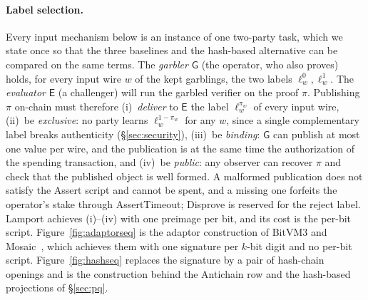 \documentclass[11pt]{article}
\begin{document}
\paragraph{Label selection.} Every input mechanism below is an instance of one
two-party task, which we state once so that the three baselines and the
hash-based alternative can be compared on the same terms. The
\emph{garbler} $\mathsf{G}$ (the operator, who also proves) holds, for every
input wire $w$ of the kept garblings, the two labels $\ell_w^0,\ell_w^1$. The
\emph{evaluator} $\mathsf{E}$ (a challenger) will run the garbled verifier on
the proof $\pi$. Publishing $\pi$ on-chain must therefore (i)~\emph{deliver} to
$\mathsf{E}$ the label $\ell_w^{\pi_w}$ of every input wire, (ii)~be
\emph{exclusive}: no party learns $\ell_w^{1-\pi_w}$ for any $w$, since a
single complementary label breaks authenticity (\S\ref{sec:security}),
(iii)~be \emph{binding}: $\mathsf{G}$ can publish at most one value per wire,
and the publication is at the same time the authorization of the spending
transaction, and (iv)~be \emph{public}: any observer can recover $\pi$ and
check that the published object is well formed. A malformed publication does
not satisfy the Assert script and cannot be spent, and a missing one forfeits
the operator's stake through AssertTimeout; Disprove is reserved for the reject
label. Lamport achieves (i)--(iv) with one
preimage per bit, and its cost is the per-bit script. Figure~\ref{fig:adaptorseq}
is the adaptor construction of BitVM3 and Mosaic~\cite{bitvm3paper,mosaic26},
which achieves them with one signature per $k$-bit digit and no per-bit script.
Figure~\ref{fig:hashseq} replaces the signature by a pair of hash-chain
openings and is the construction behind the Antichain row and the hash-based
projections of \S\ref{sec:pq}.
\end{document}
